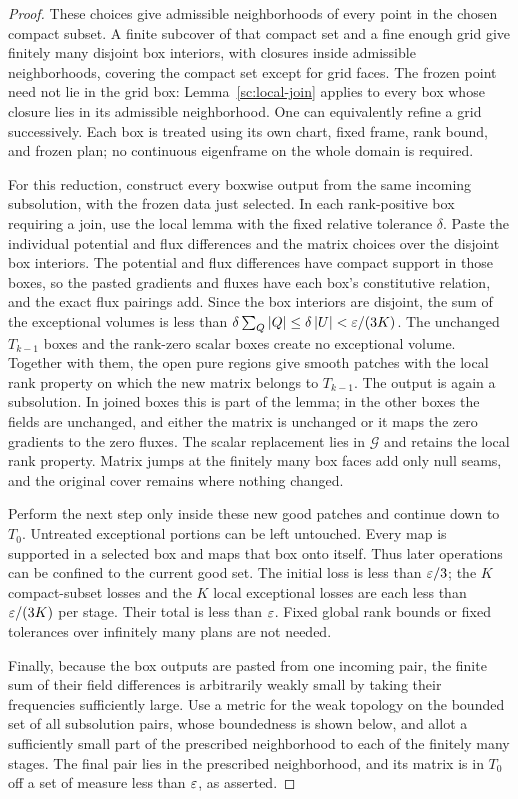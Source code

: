 \begin{proof}
These choices give admissible neighborhoods of every point in the
chosen compact subset. A finite subcover of that compact set and a fine
enough grid give finitely many disjoint box interiors, with
closures inside admissible neighborhoods, covering the compact
set except for grid faces. The frozen point need not lie in the
grid box: Lemma~\ref{sc:local-join} applies to every box whose closure
lies in its admissible neighborhood. One can equivalently refine a grid
successively. Each box is treated using its own chart, fixed
frame, rank bound, and frozen plan; no continuous eigenframe on
the whole domain is required.

For this reduction, construct every boxwise output from the same incoming
subsolution, with the frozen data just selected. In each rank-positive
box requiring a join, use the local lemma with the fixed relative tolerance
$\delta$. Paste the individual potential and flux differences and the
matrix choices over the disjoint box interiors. The potential and flux
differences have compact support in those boxes, so the pasted gradients and fluxes have each box's
constitutive relation, and the exact flux pairings add. Since the box
interiors are disjoint, the sum of the exceptional volumes is less than
$\delta\sum_Q\left\lvert Q\right\rvert\leq\delta\left\lvert U\right\rvert<\varepsilon/(3K)$. The unchanged
$T_{k-1}$ boxes and the rank-zero scalar boxes create no exceptional
volume. Together with them, the open pure regions give smooth patches
with the local rank property on which the new matrix belongs to $T_{k-1}$.
The output is again a subsolution. In joined boxes this is part of the
lemma; in the other boxes the fields are unchanged, and either the
matrix is unchanged or it maps the zero gradients to the zero fluxes.
The scalar replacement lies in $\mathcal G$ and retains the local rank
property. Matrix jumps at the finitely many box faces add only null seams,
and the original cover remains where nothing changed.

Perform the next step only inside these new good patches and
continue down to $T_0$. Untreated exceptional portions can be
left untouched. Every map is supported in a selected box and
maps that box onto itself. Thus later operations can be confined
to the current good set. The initial loss is less than $\varepsilon/3$;
the $K$ compact-subset losses and the $K$ local exceptional losses
are each less than $\varepsilon/(3K)$ per stage. Their total is less than
$\varepsilon$. Fixed global
rank bounds or fixed tolerances over infinitely many plans are
not needed.

Finally, because the box outputs are pasted from one incoming pair, the
finite sum of their field differences is arbitrarily weakly small by taking
their frequencies sufficiently large. Use a metric for the weak topology on the
bounded set of all subsolution pairs, whose boundedness is shown
below, and allot a sufficiently small part of the prescribed
neighborhood to each of the finitely many stages. The final pair
lies in the prescribed neighborhood, and its matrix is in $T_0$
off a set of measure less than $\varepsilon$, as asserted.
\end{proof}

